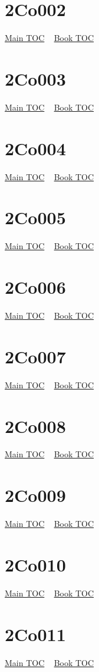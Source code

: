 \documentclass{book}
\begin{document}
  \section{2Co002}\hyperlink{toc}{Main TOC} ~ \hyperref[subsec:2Co]{Book TOC} 
  \section{2Co003}\hyperlink{toc}{Main TOC} ~ \hyperref[subsec:2Co]{Book TOC} 
  \section{2Co004}\hyperlink{toc}{Main TOC} ~ \hyperref[subsec:2Co]{Book TOC} 
  \section{2Co005}\hyperlink{toc}{Main TOC} ~ \hyperref[subsec:2Co]{Book TOC} 
  \section{2Co006}\hyperlink{toc}{Main TOC} ~ \hyperref[subsec:2Co]{Book TOC} 
  \section{2Co007}\hyperlink{toc}{Main TOC} ~ \hyperref[subsec:2Co]{Book TOC} 
  \section{2Co008}\hyperlink{toc}{Main TOC} ~ \hyperref[subsec:2Co]{Book TOC} 
  \section{2Co009}\hyperlink{toc}{Main TOC} ~ \hyperref[subsec:2Co]{Book TOC} 
  \section{2Co010}\hyperlink{toc}{Main TOC} ~ \hyperref[subsec:2Co]{Book TOC} 
  \section{2Co011}\hyperlink{toc}{Main TOC} ~ \hyperref[subsec:2Co]{Book TOC} 
\end{document}
